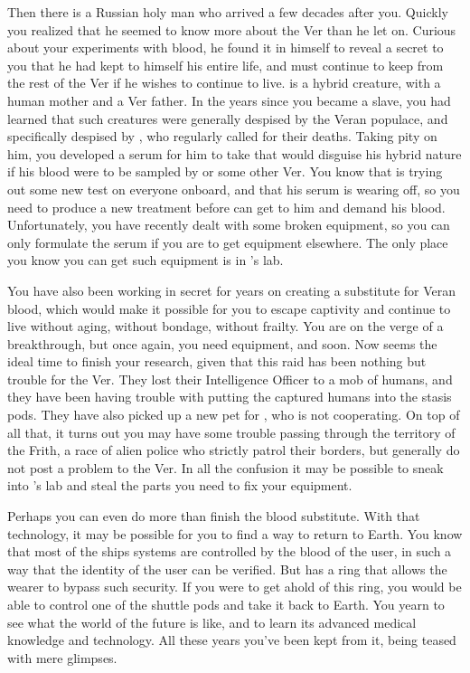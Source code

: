 \documentclass[char]{guildcamp4}
\begin{document}
Then there is \cRasputin{} a Russian holy man who arrived a few decades after you. Quickly you realized that he seemed to know more about the Ver than he let on. Curious about your experiments with blood, he found it in himself to reveal a secret to you that he had kept to himself his entire life, and must continue to keep from the rest of the Ver if he wishes to continue to live. \cRasputin{} is a hybrid creature, with a human mother and a Ver father. In the years since you became a slave, you had learned that such creatures were generally despised by the Veran populace, and specifically despised by \cVthree{}, who regularly called for their deaths. Taking pity on him, you developed a serum for him to take that would disguise his hybrid nature if his blood were to be sampled by \cVthree{} or some other Ver. You know that \cVthree{} is trying out some new test on everyone onboard, and that his serum is wearing off, so you need to produce a new treatment before \cVthree{} can get to him and demand his blood. Unfortunately, you have recently dealt with some broken equipment, so you can only formulate the serum if you are to get equipment elsewhere. The only place you know you can get such equipment is in \cVthree{}'s lab.

You have also been working in secret for years on creating a substitute for Veran blood, which would make it possible for you to escape captivity and continue to live without aging, without bondage, without frailty. You are on the verge of a breakthrough, but once again, you need equipment, and soon. Now seems the ideal time to finish your research, given that this raid has been nothing but trouble for the Ver. They lost their Intelligence Officer to a mob of humans, and they have been having trouble with putting the captured humans into the stasis pods. They have also picked up a new pet for \cVone{}, who is not cooperating. On top of all that, it turns out you may have some trouble passing through the territory of the Frith, a race of alien police who strictly patrol their borders, but generally do not post a problem to the Ver. In all the confusion it may be possible to sneak into \cVthree{}'s lab and steal the parts you need to fix your equipment.

Perhaps you can even do more than finish the blood substitute. With that technology, it may be possible for you to find a way to return to Earth. You know that most of the ships systems are controlled by the blood of the user, in such a way that the identity of the user can be verified. But \cVone{} has a ring that allows the wearer to bypass such security. If you were to get ahold of this ring, you would be able to control one of the shuttle pods and take it back to Earth. You yearn to see what the world of the future is like, and to learn its advanced medical knowledge and technology. All these years you've been kept from it, being teased with mere glimpses. 
\end{document}
